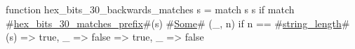 function hex_bits_30_backwards_matches s = match s {
  s if match #\hyperref[sailRISCVzhexzybitszy30zymatcheszyprefix]{hex\_bits\_30\_matches\_prefix}#(s) {
    #\hyperref[sailRISCVzSome]{Some}# (_, n) if n == #\hyperref[sailRISCVzstringzylength]{string\_length}#(s) => true,
    _ => false
  } => true,
  _ => false
}
